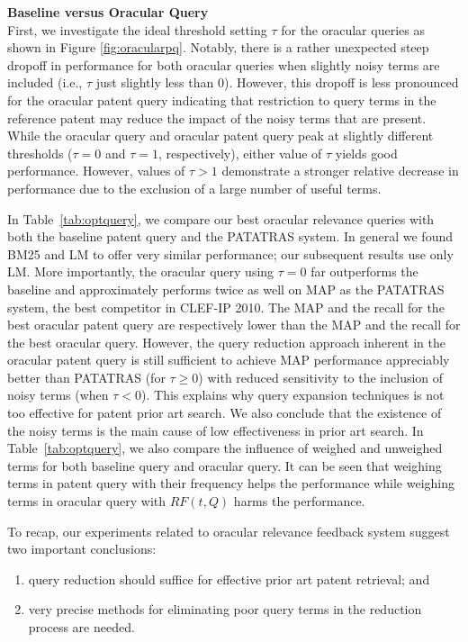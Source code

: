 \textbf{Baseline versus Oracular Query}
\ \\
First, we investigate the ideal threshold setting $\tau$ for the
oracular queries as shown in Figure \ref{fig:oracularpq}.  Notably,
there is a rather unexpected steep dropoff in performance for both
oracular queries when slightly noisy terms are included
(i.e., $\tau$ just slightly less than 0).  However, this dropoff is
less pronounced for the
oracular patent query indicating that restriction to query terms in the
reference patent may reduce the impact of the noisy terms that are present.
While the oracular query and oracular patent query peak
at slightly different thresholds ($\tau = 0$ and $\tau = 1$, respectively), 
either value of $\tau$ yields good performance.
However, values of $\tau > 1$
demonstrate a stronger relative decrease in performance due to the exclusion 
of a large number of useful terms.

In Table~\ref{tab:optquery}, we compare our best oracular relevance
queries with both the baseline patent query and the PATATRAS
system.  In general we found BM25 and LM to offer very similar
performance;  our subsequent results use only LM.  More
importantly, the oracular query using $\tau=0$ far
outperforms the baseline and approximately performs twice as well on
MAP as the PATATRAS system, the best competitor in CLEF-IP 2010.  The
MAP and the recall for the best oracular patent query are
respectively lower than the MAP and the recall for the
best oracular query.  However, the query reduction approach
inherent in the oracular patent query is still sufficient to
achieve MAP performance appreciably better than PATATRAS (for
$\tau \geq 0$) with reduced sensitivity to the inclusion of noisy
terms (when $\tau < 0$). 
This explains why query expansion techniques is not too effective for patent prior art search. We also conclude that the existence of the noisy terms is the main cause of low effectiveness in prior art search. In Table~\ref{tab:optquery}, we also compare the influence of weighed and unweighed terms for both baseline query and oracular query. It can be seen that weighing terms in patent query with their frequency helps the performance while weighing terms in oracular query with $RF(t, Q)$ harms the performance.  

To recap, our experiments related to oracular relevance feedback system
suggest two important conclusions: 
\begin{enumerate}
\item query reduction should suffice for effective prior art patent retrieval; and  
\item very precise methods for eliminating poor query terms in the reduction process are needed.
\end{enumerate}



